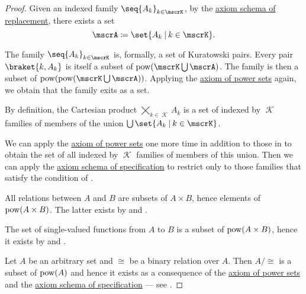 \begin{proof}
   Given an indexed family \( \seq{ A_k }_{k \in \mscrK} \), by the \hyperref[def:zfc/replacement]{axiom schema of replacement}, there exists a set
  \begin{equation*}
    \mscrA \coloneqq \set{ A_k \given k \in \mscrK }.
  \end{equation*}

  The family \( \seq{ A_k }_{k \in \mscrK} \) is, formally, a set of Kuratowski pairs. Every pair \( \braket{ k, A_k } \) is itself a subset of \( \pow(\mscrK \bigcup \mscrA) \). The family is then a subset of \( \pow(\pow(\mscrK \bigcup \mscrA)) \). Applying the \hyperref[def:zfc/power_set]{axiom of power sets} again, we obtain that the family exits as a set.

   By definition, the Cartesian product \( \bigtimes_{k \in \mscrK} A_k \) is a set of indexed by \( \mscrK \) families of members of the union \( \bigcup\set{ A_k \given k \in \mscrK } \).

  We can apply the \hyperref[def:zfc/power_set]{axiom of power sets} one more time in addition to those in  to obtain the set of all indexed by \( \mscrK \) families of members of this union. Then we can apply the \hyperref[def:zfc/specification]{axiom schema of specification} to restrict only to those families that satisfy the condition of .

   All relations between \( A \) and \( B \) are subsets of \( A \times B \), hence elements of \( \operatorname{pow}(A \times B) \). The latter exists by  and .

   The set of single-valued functions from \( A \) to \( B \) is a subset of \( \operatorname{pow}(A \times B) \), hence it exists by  and .

   Let \( A \) be an arbitrary set and \( \cong \) be a binary relation over \( A \). Then \( A / {\cong} \) is a subset of \( \operatorname{pow}(A) \) and hence it exists as a consequence of the \hyperref[def:zfc/power_set]{axiom of power sets} and the \hyperref[def:zfc/specification]{axiom schema of specification} --- see .


\end{proof}
